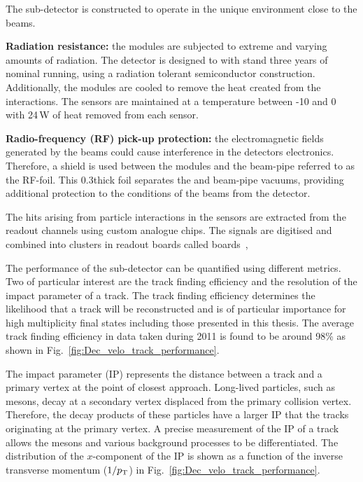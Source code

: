 The \velo sub-detector is constructed to operate in the unique environment close to the \lhc beams.
\begin{description}   
\item \textbf{Radiation resistance:} the \velo modules are subjected to extreme and varying amounts of radiation. The detector is designed to with stand three years of nominal \lhc running, using a radiation tolerant semiconductor construction. Additionally, the \velo modules are cooled to remove the heat created from the interactions. The sensors are maintained at a temperature between -10 and 0 with 24\,W of heat removed from each sensor.  
\item \textbf{Radio-frequency (RF) pick-up protection:} the electromagnetic fields generated by the \lhc beams could cause interference in the \velo detectors electronics. Therefore, a shield is used between the modules and the beam-pipe referred to as the RF-foil. This 0.3\mm thick foil separates the \velo and beam-pipe vacuums, providing additional protection to the conditions of the beams from the detector.
\end{description}   

The hits arising from particle interactions in the \velo sensors are extracted from the readout channels using custom analogue chips. The signals are digitised and combined into clusters in readout boards called \tellone boards~\cite{HAEFELI2006494}, 


The performance of the \velo sub-detector can be quantified using different metrics. Two of particular interest are the track finding efficiency and the resolution of the impact parameter of a track. 
The track finding efficiency determines the likelihood that a track will be reconstructed and is of particular importance for high multiplicity final states including those presented in this thesis. The average track finding efficiency in data taken during 2011 is found to be around 98\% as shown in Fig.~\ref{fig:Dec_velo_track_performance}.

The impact parameter (IP) represents the distance between a track and a primary vertex at the point of closest approach. Long-lived particles, such as \Bp mesons, decay at a secondary vertex displaced from the primary collision vertex. Therefore, the decay products of these particles have a larger IP that the tracks originating at the primary vertex. A precise measurement of the IP of a track allows the \Bp mesons and various background processes to be differentiated. The distribution of the $x$-component of the IP is shown as a function of the inverse transverse momentum ($1/\mbox{$p_{\mathrm{ T}}$}$) in Fig.~\ref{fig:Dec_velo_track_performance}.  

